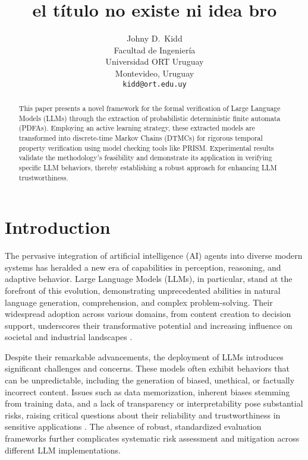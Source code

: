 \documentclass{article}
\title{el título no existe ni idea bro}
\author{{\hspace{1mm}Johny D.~Kidd} \\
	Facultad de Ingeniería\\
	Universidad ORT Uruguay\\
        Montevideo, Uruguay\\
	\texttt{kidd@ort.edu.uy} \\
}
\begin{document}
\maketitle

\begin{abstract}
	This paper presents a novel framework for the formal verification of Large Language Models (LLMs) through the extraction of probabilistic deterministic finite automata (PDFAs). Employing an active learning strategy, these extracted models are transformed into discrete-time Markov Chains (DTMCs) for rigorous temporal property verification using model checking tools like PRISM. Experimental results validate the methodology's feasibility and demonstrate its application in verifying specific LLM behaviors, thereby establishing a robust approach for enhancing LLM trustworthiness.
\end{abstract}







\section{Introduction}

The pervasive integration of artificial intelligence (AI) agents into diverse modern systems has heralded a new era of capabilities in perception, reasoning, and adaptive behavior. Large Language Models (LLMs), in particular, stand at the forefront of this evolution, demonstrating unprecedented abilities in natural language generation, comprehension, and complex problem-solving. Their widespread adoption across various domains, from content creation to decision support, underscores their transformative potential and increasing influence on societal and industrial landscapes \cite{chen2022runtime, russell2016artificial}.

Despite their remarkable advancements, the deployment of LLMs introduces significant challenges and concerns. These models often exhibit behaviors that can be unpredictable, including the generation of biased, unethical, or factually incorrect content. Issues such as data memorization, inherent biases stemming from training data, and a lack of transparency or interpretability pose substantial risks, raising critical questions about their reliability and trustworthiness in sensitive applications \cite{ai_index_2024, aiaaic_repository, ai_index_chapter3}. The absence of robust, standardized evaluation frameworks further complicates systematic risk assessment and mitigation across different LLM implementations.
\end{document}
